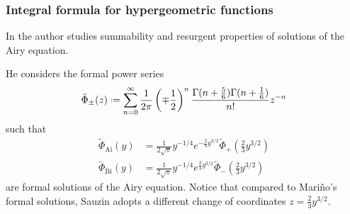 \documentclass{article}
\newcommand{\series}[1]{\tilde{#1}}
\newcommand*{\defeq}{\mathrel{\vcenter{\baselineskip0.5ex \lineskiplimit0pt
                     \hbox{\scriptsize.}\hbox{\scriptsize.}}}%
                     =}
\newcommand{\borel}{\mathcal{B}}
\theoremstyle{definition}
\theoremstyle{plain}
\begin{document}
%
%
%



\subsubsection{Integral formula for hypergeometric functions}

In \cite{diverg-resurg-i} the author studies summability and resurgent properties of solutions of the Airy equation. 

He considers the formal power series  
\[\series{\Phi}_{\pm}(z)\defeq \sum_{n=0}^{\infty}\frac{1}{2\pi}\left(\mp\frac{1}{2}\right)^{n}\frac{\Gamma(n+\frac{5}{6})\Gamma(n+\frac{1}{6})}{n!}z^{-n}\]
such that
\begin{align*}
\series{\Phi}_{\mathrm{Ai}}(y)&=\frac{1}{2\sqrt{\pi}}y^{-1/4}e^{-\tfrac{2}{3}y^{3/2}}\series{\Phi}_{+}\left(\tfrac{2}{3}y^{3/2}\right)\\
\series{\Phi}_{\mathrm{Bi}}(y)&=\frac{1}{2\sqrt{\pi}}y^{-1/4}e^{\tfrac{2}{3}y^{3/2}}\series{\Phi}_{-}\left(\tfrac{2}{3}y^{3/2}\right)
\end{align*} 
are formal solutions of the Airy equation. Notice that compared to Mari\~{n}o's formal solutions, Sauzin adopts a different change of coordinates $z=\frac{2}{3}y^{3/2}$.  
\end{document}
